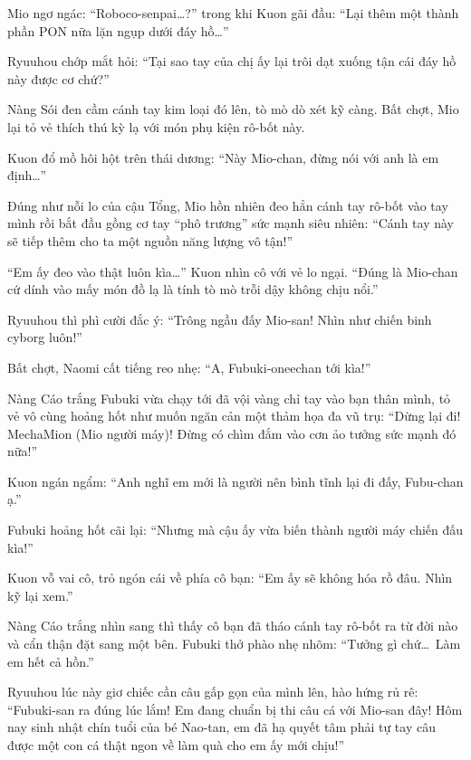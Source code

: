 \documentclass[../main.tex]{subfiles}
\begin{document}
Mio ngơ ngác: ``Roboco-senpai\dots?'' trong khi Kuon gãi đầu: ``Lại thêm một thành phần PON nữa lặn ngụp dưới đáy hồ\dots''

Ryuuhou chớp mắt hỏi: ``Tại sao tay của chị ấy lại trôi dạt xuống tận cái đáy hồ này được cơ chứ?''

Nàng Sói đen cầm cánh tay kim loại đó lên, tò mò dò xét kỹ càng. Bất chợt, Mio lại tỏ vẻ thích thú kỳ lạ với món phụ kiện rô-bốt này.

Kuon đổ mồ hôi hột trên thái dương: ``Này Mio-chan, đừng nói với anh là em định\dots''

Đúng như nỗi lo của cậu Tổng, Mio hồn nhiên đeo hẳn cánh tay rô-bốt vào tay mình rồi bắt đầu gồng cơ tay ``phô trương'' sức mạnh siêu nhiên: ``Cánh tay này sẽ tiếp thêm cho ta một nguồn năng lượng vô tận!''


``Em ấy đeo vào thật luôn kìa\dots'' Kuon nhìn cô với vẻ lo ngại. ``Đúng là Mio-chan cứ dính vào mấy món đồ lạ là tính tò mò trỗi dậy không chịu nổi.''

Ryuuhou thì phì cười đắc ý: ``Trông ngầu đấy Mio-san! Nhìn như chiến binh cyborg luôn!''

Bất chợt, Naomi cất tiếng reo nhẹ: ``A, Fubuki-oneechan tới kìa!''

Nàng Cáo trắng Fubuki vừa chạy tới đã vội vàng chỉ tay vào bạn thân mình, tỏ vẻ vô cùng hoảng hốt như muốn ngăn cản một thảm họa đa vũ trụ: ``Dừng lại đi! MechaMion (Mio người máy)! Đừng có chìm đắm vào cơn ảo tưởng sức mạnh đó nữa!''


Kuon ngán ngẩm: ``Anh nghĩ em mới là người nên bình tĩnh lại đi đấy, Fubu-chan ạ.''

Fubuki hoảng hốt cãi lại: ``Nhưng mà cậu ấy vừa biến thành người máy chiến đấu kìa!''

Kuon vỗ vai cô, trỏ ngón cái về phía cô bạn: ``Em ấy sẽ không hóa rồ đâu. Nhìn kỹ lại xem.''

Nàng Cáo trắng nhìn sang thì thấy cô bạn đã tháo cánh tay rô-bốt ra từ đời nào và cẩn thận đặt sang một bên. Fubuki thở phào nhẹ nhõm: ``Tưởng gì chứ\dots\ Làm em hết cả hồn.''

Ryuuhou lúc này giơ chiếc cần câu gấp gọn của mình lên, hào hứng rủ rê: ``Fubuki-san ra đúng lúc lắm! Em đang chuẩn bị thi câu cá với Mio-san đây! Hôm nay sinh nhật chín tuổi của bé Nao-tan, em đã hạ quyết tâm phải tự tay câu được một con cá thật ngon về làm quà cho em ấy mới chịu!''
\end{document}
